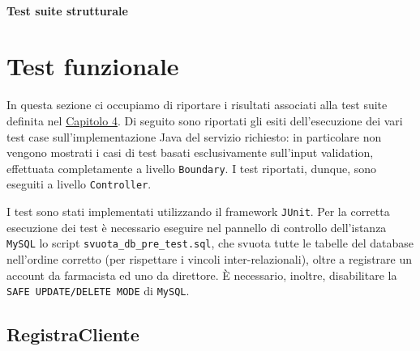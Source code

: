 \vfill
\pagebreak

\paragraph{Test suite strutturale}\mbox{}\newline




\section{Test funzionale}
In questa sezione ci occupiamo di riportare i risultati associati alla test suite definita nel \hyperref[cap:piano_test_funzionale]{Capitolo 4}. Di seguito sono riportati gli esiti dell'esecuzione dei vari test case sull'implementazione Java del servizio richiesto: in particolare non vengono mostrati i casi di test basati esclusivamente sull'input validation, effettuata completamente a livello \texttt{Boundary}. I test riportati, dunque, sono eseguiti a livello \texttt{Controller}.

I test sono stati implementati utilizzando il framework \texttt{JUnit}. Per la corretta esecuzione dei test è necessario eseguire nel pannello di controllo dell'istanza \texttt{MySQL} lo script \texttt{svuota\_db\_pre\_test.sql}, che svuota tutte le tabelle del database nell'ordine corretto (per rispettare i vincoli inter-relazionali), oltre a registrare un account da farmacista ed uno da direttore. È necessario, inoltre, disabilitare la \texttt{SAFE UPDATE/DELETE MODE} di \texttt{MySQL}.

\subsection{RegistraCliente}


